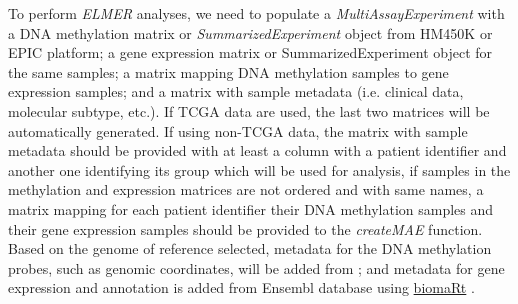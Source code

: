 

To perform \textit{ELMER} analyses, we need to populate a \textit{MultiAssayExperiment} with a DNA methylation matrix or \textit{SummarizedExperiment} object from HM450K or EPIC platform; a gene expression matrix or SummarizedExperiment object for the same samples; a matrix mapping DNA methylation samples to gene expression samples; and a matrix with sample metadata (i.e. clinical data, molecular subtype, etc.). If TCGA data are used, the last two matrices will be automatically generated.
If using non-TCGA data,  the matrix with sample metadata should be provided with at least a column with a patient identifier and another one identifying its group which will be used for analysis, if samples in the methylation and expression matrices are not ordered and with same names, a matrix mapping for each patient identifier their DNA methylation samples and their gene expression samples should be provided to the \textit{createMAE} function.
Based on the genome of reference selected, metadata for the DNA methylation probes, such as genomic coordinates, will be added from   \href{http://zwdzwd.github.io/InfiniumAnnotation}{}; 
and metadata for gene expression and annotation is added from Ensembl database \cite{yates2015ensembl} using \href{http://bioconductor.org/packages/biomaRt/}{biomaRt}
\cite{durinck2009mapping}. 
% 
% 
% 
%

